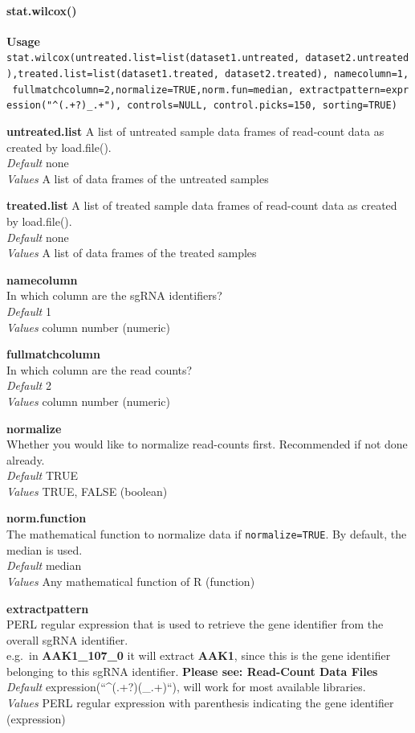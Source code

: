 \documentclass[]{article}
\let\oldparagraph\paragraph
\renewcommand{\paragraph}[1]{\oldparagraph{#1}\mbox{}}
\begin{document}
\paragraph{stat.wilcox()}\label{stat.wilcox}

\textbf{Usage}\\
\texttt{stat.wilcox(untreated.list=list(dataset1.untreated,\ dataset2.untreated),treated.list=list(dataset1.treated,\ dataset2.treated),\ namecolumn=1,\ fullmatchcolumn=2,normalize=TRUE,norm.fun=median,\ extractpattern=expression("\^{}(.+?)\_.+"),\ controls=NULL,\ control.picks=150,\ sorting=TRUE)}

\textbf{untreated.list} A list of untreated sample data frames of
read-count data as created by load.file().\\
\emph{Default} none\\
\emph{Values} A list of data frames of the untreated samples

\textbf{treated.list} A list of treated sample data frames of read-count
data as created by load.file().\\
\emph{Default} none\\
\emph{Values} A list of data frames of the treated samples

\textbf{namecolumn}\\
In which column are the sgRNA identifiers?\\
\emph{Default} 1\\
\emph{Values} column number (numeric)

\textbf{fullmatchcolumn}\\
In which column are the read counts?\\
\emph{Default} 2\\
\emph{Values} column number (numeric)

\textbf{normalize}\\
Whether you would like to normalize read-counts first. Recommended if
not done already.\\
\emph{Default} TRUE\\
\emph{Values} TRUE, FALSE (boolean)

\textbf{norm.function}\\
The mathematical function to normalize data if \texttt{normalize=TRUE}.
By default, the median is used.\\
\emph{Default} median\\
\emph{Values} Any mathematical function of R (function)

\textbf{extractpattern}\\
PERL regular expression that is used to retrieve the gene identifier
from the overall sgRNA identifier.\\
e.g.~in \textbf{AAK1\_107\_0} it will extract \textbf{AAK1}, since this
is the gene identifier belonging to this sgRNA identifier.
\textbf{Please see: Read-Count Data Files}\\
\emph{Default} expression(``\^{}(.+?)(\_.+)``), will work for most
available libraries.\\
\emph{Values} PERL regular expression with parenthesis indicating the
gene identifier (expression)
\end{document}
